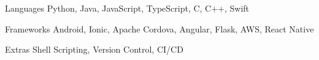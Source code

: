 
\begin{cvskills}
  \cvskill
    {Languages} %
    {Python, Java, JavaScript, TypeScript, C, C++, Swift} %

  \cvskill
    {Frameworks} %
    {Android, Ionic, Apache Cordova, Angular, Flask, AWS, React Native} %
    
   \cvskill
    {Extras} %
    {Shell Scripting, Version Control, CI/CD} %
\end{cvskills}
